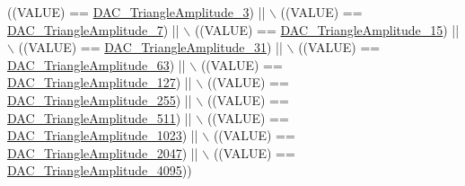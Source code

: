 \begin{DoxyCode}
                                                      ((VALUE) == 
      \hyperlink{group___d_a_c__lfsrunmask__triangleamplitude_ga9798d68c3bbf0a57306bf2f962697377}{DAC\_TriangleAmplitude\_3}) || \(\backslash\)
                                                      ((VALUE) == 
      \hyperlink{group___d_a_c__lfsrunmask__triangleamplitude_gad3f31de1277836df1109576a53c47e87}{DAC\_TriangleAmplitude\_7}) || \(\backslash\)
                                                      ((VALUE) == 
      \hyperlink{group___d_a_c__lfsrunmask__triangleamplitude_ga42653712ce783d33ecb2f3e97e9c2ece}{DAC\_TriangleAmplitude\_15}) || \(\backslash\)
                                                      ((VALUE) == 
      \hyperlink{group___d_a_c__lfsrunmask__triangleamplitude_ga10b15745b749c62a56bd3d7bd5a27e1b}{DAC\_TriangleAmplitude\_31}) || \(\backslash\)
                                                      ((VALUE) == 
      \hyperlink{group___d_a_c__lfsrunmask__triangleamplitude_gaaae92dae9c4da55e29c645396825e36b}{DAC\_TriangleAmplitude\_63}) || \(\backslash\)
                                                      ((VALUE) == 
      \hyperlink{group___d_a_c__lfsrunmask__triangleamplitude_gaacec0af3f69db46f8984be3af9ecadfb}{DAC\_TriangleAmplitude\_127}) || \(\backslash\)
                                                      ((VALUE) == 
      \hyperlink{group___d_a_c__lfsrunmask__triangleamplitude_gadb404422c86a7b92d78e6d9617e8ce4d}{DAC\_TriangleAmplitude\_255}) || \(\backslash\)
                                                      ((VALUE) == 
      \hyperlink{group___d_a_c__lfsrunmask__triangleamplitude_ga565b0c97bbdf152756617d491bf8ef85}{DAC\_TriangleAmplitude\_511}) || \(\backslash\)
                                                      ((VALUE) == 
      \hyperlink{group___d_a_c__lfsrunmask__triangleamplitude_ga7d573b0cebb1b939bd83367effb93d89}{DAC\_TriangleAmplitude\_1023}) || \(\backslash\)
                                                      ((VALUE) == 
      \hyperlink{group___d_a_c__lfsrunmask__triangleamplitude_gad33d28d7fcc09d84500ea9b6e6c5feed}{DAC\_TriangleAmplitude\_2047}) || \(\backslash\)
                                                      ((VALUE) == 
      \hyperlink{group___d_a_c__lfsrunmask__triangleamplitude_ga3ce69f5a63a2464dc4b5f73cb6fe72f5}{DAC\_TriangleAmplitude\_4095}))
\end{DoxyCode}
